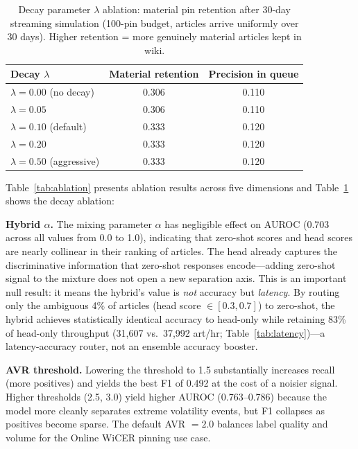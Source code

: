 \documentclass{article}
\begin{document}
\begin{table}[t]
\centering
\caption{Decay parameter $\lambda$ ablation: material pin retention after 30-day streaming simulation (100-pin budget, articles arrive uniformly over 30 days). Higher retention = more genuinely material articles kept in wiki.}
\label{tab:decay}
\small
\begin{tabular}{@{}lcc@{}}
\toprule
\textbf{Decay $\lambda$} & \textbf{Material retention} & \textbf{Precision in queue} \\
\midrule
$\lambda = 0.00$ (no decay)   & 0.306 & 0.110 \\
$\lambda = 0.05$               & 0.306 & 0.110 \\
$\lambda = 0.10$ (default)     & 0.333 & 0.120 \\
$\lambda = 0.20$               & 0.333 & 0.120 \\
$\lambda = 0.50$ (aggressive)  & 0.333 & 0.120 \\
\bottomrule
\end{tabular}
\end{table}

Table~\ref{tab:ablation} presents ablation results across five dimensions and Table~\ref{tab:decay} shows the decay ablation:

\textbf{Hybrid $\alpha$.}
The mixing parameter $\alpha$ has negligible effect on AUROC (0.703 across all values from 0.0 to 1.0), indicating that zero-shot scores and head scores are nearly collinear in their ranking of articles.
The head already captures the discriminative information that zero-shot responses encode---adding zero-shot signal to the mixture does not open a new separation axis.
This is an important null result: it means the hybrid's value is \emph{not} accuracy but \emph{latency}. By routing only the ambiguous 4\% of articles (head score $\in [0.3, 0.7]$) to zero-shot, the hybrid achieves statistically identical accuracy to head-only while retaining 83\% of head-only throughput (31,607 vs.\ 37,992 art/hr; Table~\ref{tab:latency})---a latency-accuracy router, not an ensemble accuracy booster.

\textbf{AVR threshold.}
Lowering the threshold to 1.5 substantially increases recall (more positives) and yields the best F1 of 0.492 at the cost of a noisier signal.
Higher thresholds (2.5, 3.0) yield higher AUROC (0.763--0.786) because the model more cleanly separates extreme volatility events, but F1 collapses as positives become sparse.
The default AVR $= 2.0$ balances label quality and volume for the Online WiCER pinning use case.
\end{document}
